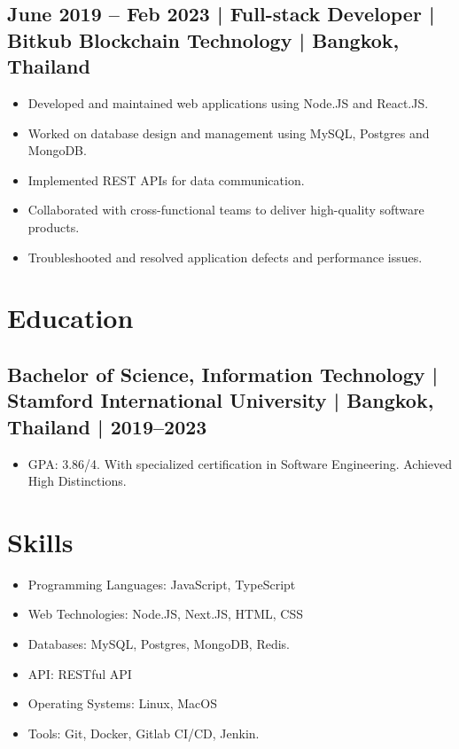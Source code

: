 \documentclass[letterpaper,11pt]{article}
\begin{document}
\subsection*{June 2019 -- Feb 2023 | Full-stack Developer | Bitkub Blockchain Technology | Bangkok, Thailand}
\begin{itemize}
    \item Developed and maintained web applications using Node.JS and React.JS.
    \item Worked on database design and management using MySQL, Postgres and MongoDB.
    \item Implemented REST APIs for data communication.
    \item Collaborated with cross-functional teams to deliver high-quality software products.
    \item Troubleshooted and resolved application defects and performance issues.
\end{itemize}

\section*{Education}
\subsection*{Bachelor of Science, Information Technology | Stamford International University | Bangkok, Thailand | 2019--2023}
\begin{itemize}
    \item GPA: 3.86/4. With specialized certification in Software Engineering. Achieved High Distinctions.
\end{itemize}

\section*{Skills}
\begin{itemize}
    \item Programming Languages: JavaScript, TypeScript
    \item Web Technologies: Node.JS, Next.JS, HTML, CSS
    \item Databases: MySQL, Postgres, MongoDB, Redis.
    \item API: RESTful API
    \item Operating Systems: Linux, MacOS
    \item Tools: Git, Docker, Gitlab CI/CD, Jenkin.
\end{itemize}
\end{document}
